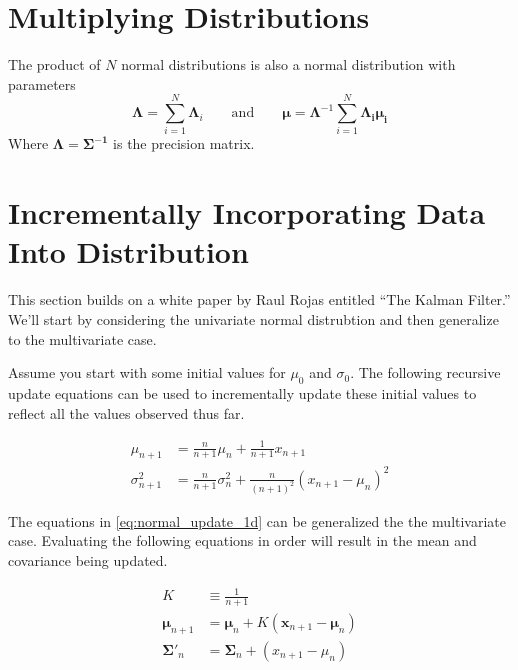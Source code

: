 \documentclass[../../main.tex]{subfiles}
\begin{document}
\section{Multiplying Distributions}
The product of $N$ normal distributions is also a normal distribution with
parameters
\begin{equation}
    \label{eq:sum_normal_mu_var}
    \boldsymbol\Lambda = \sum\limits_{i=1}^{N}\boldsymbol\Lambda_i
    \qquad\text{and}\qquad
    \boldsymbol\mu = \boldsymbol\Lambda^{-1}\sum\limits_{i=1}^{N}\boldsymbol{\Lambda_i\mu_i}
\end{equation}
Where $\boldsymbol{\Lambda} = \boldsymbol{\Sigma^{-1}}$ is the precision
matrix.


\section{Incrementally Incorporating Data Into Distribution}
This section builds on a white paper by Raul Rojas entitled ``The Kalman
Filter.''  We'll start by considering the univariate normal distrubtion
and then generalize to the multivariate case. 

Assume you start with some initial values for $\mu_0$ and $\sigma_0$.  The
following recursive update equations can be used to incrementally update these
initial values to reflect all the values observed thus far.

\begin{align}
    \label{eq:normal_update_1d}
    \mu_{n+1} &= \frac{n}{n + 1} \mu_n  + \frac{1}{n+1}x_{n+1} \\
    \sigma_{n+1}^2 &= \frac{n}{n + 1}\sigma_n^2
        + \frac{n}{(n+1)^2} \left( x_{n+1} - \mu_n \right) ^ 2\nonumber
\end{align}

The equations in \eqref{eq:normal_update_1d} can be generalized the the
multivariate case.  Evaluating the following equations in order will result in
the mean and covariance being updated.

\begin{align}
    \label{eq:normal_update_multi}
    K &\equiv \frac{1}{n + 1}\\
    \boldsymbol{\mu}_{n+1} &= \boldsymbol{\mu}_{n} +
                              K \left(
                                  \boldsymbol{x}_{n+1} - \boldsymbol{\mu}_{n}
                              \right) \nonumber\\
    {\boldsymbol{\Sigma}'}_{n} &= \boldsymbol{\Sigma}_{n}
                              + \left( x_{n+1} - \mu_n  \right)
\end{align}


 
\end{document}
